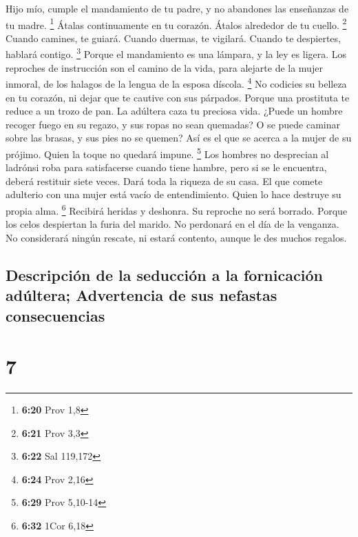  Hijo mío, cumple el mandamiento de tu padre, y no
abandones las enseñanzas de tu madre. \footnote{\textbf{6:20} Prov 1,8}
 Átalas continuamente en tu corazón. Átalos alrededor de
tu cuello. \footnote{\textbf{6:21} Prov 3,3}  Cuando
camines, te guiará. Cuando duermas, te vigilará. Cuando te despiertes,
hablará contigo. \footnote{\textbf{6:22} Sal 119,172} 
Porque el mandamiento es una lámpara, y la ley es ligera. Los reproches
de instrucción son el camino de la vida,  para alejarte
de la mujer inmoral, de los halagos de la lengua de la esposa díscola.
\footnote{\textbf{6:24} Prov 2,16}  No codicies su
belleza en tu corazón, ni dejar que te cautive con sus párpados.
 Porque una prostituta te reduce a un trozo de pan. La
adúltera caza tu preciosa vida.  ¿Puede un hombre recoger
fuego en su regazo, y sus ropas no sean quemadas?  O se
puede caminar sobre las brasas, y sus pies no se quemen? 
Así es el que se acerca a la mujer de su prójimo. Quien la toque no
quedará impune. \footnote{\textbf{6:29} Prov 5,10-14} 
Los hombres no desprecian al ladrónsi roba para satisfacerse cuando
tiene hambre,  pero si se le encuentra, deberá restituir
siete veces. Dará toda la riqueza de su casa.  El que
comete adulterio con una mujer está vacío de entendimiento. Quien lo
hace destruye su propia alma. \footnote{\textbf{6:32} 1Cor 6,18}
 Recibirá heridas y deshonra. Su reproche no será
borrado.  Porque los celos despiertan la furia del
marido. No perdonará en el día de la venganza.  No
considerará ningún rescate, ni estará contento, aunque le des muchos
regalos.

\hypertarget{descripciuxf3n-de-la-seducciuxf3n-a-la-fornicaciuxf3n-aduxfaltera-advertencia-de-sus-nefastas-consecuencias}{%
\subsection{Descripción de la seducción a la fornicación adúltera;
Advertencia de sus nefastas
consecuencias}\label{descripciuxf3n-de-la-seducciuxf3n-a-la-fornicaciuxf3n-aduxfaltera-advertencia-de-sus-nefastas-consecuencias}}

\hypertarget{section-6}{%
\section{7}\label{section-6}}

